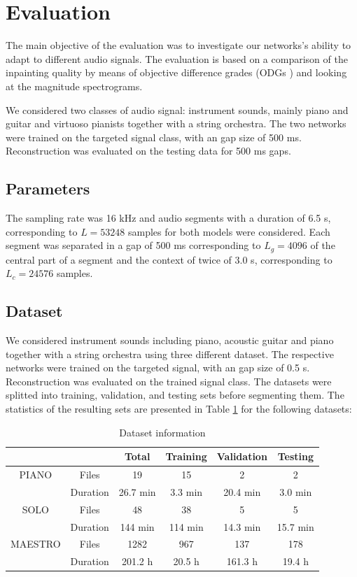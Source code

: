 \documentclass{article} %
\begin{document}
\section{Evaluation}
The main objective of the evaluation was to investigate our networks's ability to adapt to different audio signals. The evaluation is based on a comparison of the inpainting quality by means of objective difference grades (ODGs \cite{recommendatioin2001}) and looking at the magnitude spectrograms.

We considered two classes of audio signal: instrument sounds, mainly piano and guitar and virtuoso pianists together with a string orchestra. The two networks were trained on the targeted signal class, with an gap size of 500 ms. Reconstruction was evaluated on the testing data for 500 ms gaps. 


\subsection{Parameters}
The sampling rate was 16 kHz and audio segments with a duration of 6.5 s, corresponding to $L=53248$ samples for both models were considered. Each segment was separated in a gap of 500 ms corresponding to $L_g=4096$ of the central part of a segment and the context of twice of 3.0 s, corresponding to $L_c=24576$ samples.


\subsection{Dataset}
We considered instrument sounds including piano, acoustic guitar and piano together with a string orchestra using three different dataset. The respective networks were trained on the targeted signal, with an gap size of 0.5 s. Reconstruction was evaluated on the trained signal class. The datasets were splitted into training, validation, and testing sets before segmenting them. The statistics of the resulting sets are presented in Table \ref{tab:maestro} for the following datasets:

\begin{table}[ht]
    \centering
    \begin{tabular}{c|c|c|c|c|c}
        \hline
         &      & Total & Training & Validation & Testing \\
        \hline
        PIANO   & Files     & 19 & 15 & 2 & 2 \\
                & Duration  & 26.7 min & 3.3 min & 20.4 min & 3.0 min \\
        \hline
        SOLO    & Files     & 48 & 38 & 5 & 5 \\
                & Duration  & 144 min & 114 min & 14.3 min & 15.7 min\\
        \hline
        MAESTRO & Files     & 1282 & 967 & 137 & 178 \\
                & Duration  & 201.2 h & 20.5 h & 161.3 h & 19.4 h \\
        \hline
    \end{tabular}
    \caption{Dataset information}
    \label{tab:maestro}
\end{table}
\end{document}
